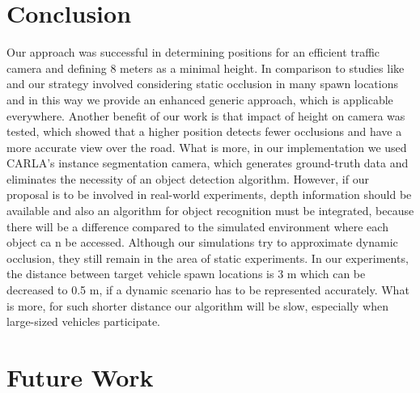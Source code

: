 \section{Conclusion}
Our approach was successful in determining positions for an efficient traffic camera and defining 8 meters as a minimal height. In comparison to studies like \cite{total_coverage_optimum} and \cite{max_camera_coverage} our strategy involved considering static occlusion in many spawn locations and in this way we provide an enhanced generic approach, which is applicable everywhere. Another benefit of our work is that impact of height on camera was tested, which showed that a higher position detects fewer occlusions and have a more accurate view over the road. What is more, in our implementation we used CARLA's instance segmentation camera, which generates ground-truth data and eliminates the necessity of an object detection algorithm. However, if our proposal is to be involved in real-world experiments, depth information should be available and also an algorithm for object recognition must be integrated, because there will be a difference compared to the simulated environment where each object ca n be accessed. Although our simulations try to approximate dynamic occlusion, they still remain in the area of static experiments. In our experiments, the distance between target vehicle spawn locations is 3 m which can be decreased to 0.5 m, if a dynamic scenario has to be represented accurately. What is more, for such shorter distance our algorithm will be slow, especially when large-sized vehicles participate. 

\section{Future Work}

